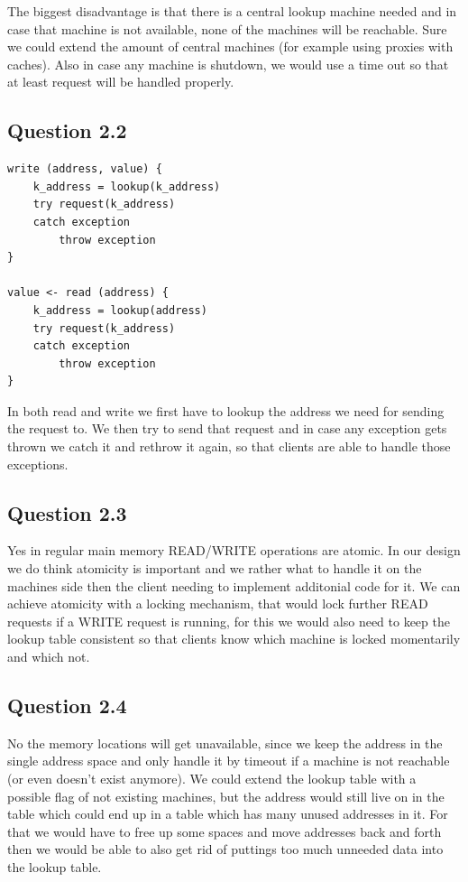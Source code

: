 \documentclass[12pt,a4paper]{article}
\begin{document}
The biggest disadvantage is that there is a central lookup machine needed and in case that machine is not available, none of the machines will be reachable.
Sure we could extend the amount of central machines (for example using proxies with caches).
Also in case any machine is shutdown, we would use a time out so that at least request will be handled properly.

\subsection{Question 2.2}

\begin{verbatim}
write (address, value) {
	k_address = lookup(k_address)
	try request(k_address)
	catch exception
		throw exception
}

value <- read (address) {
	k_address = lookup(address)
	try request(k_address)
	catch exception
		throw exception
}
\end{verbatim}

In both read and write we first have to lookup the address we need for sending the request to. We then try to send that request and in case any exception gets thrown we catch it and rethrow it again, so that clients are able to handle those exceptions.

\subsection{Question 2.3}
Yes in regular main memory READ/WRITE operations are atomic.
In our design we do think atomicity is important and we rather what to handle it on the machines side then the client needing to implement additonial code for it.
We can achieve atomicity with a locking mechanism, that would lock further READ requests if a WRITE request is running, for this we would also need to keep the lookup table consistent so that clients know which machine is locked momentarily and which not.

\subsection{Question 2.4}
No the memory locations will get unavailable, since we keep the address in the single address space and only handle it by timeout if a machine is not reachable (or even doesn't exist anymore).
We could extend the lookup table with a possible flag of not existing machines, but the address would still live on in the table which could end up in a table which has many unused addresses in it.
For that we would have to free up some spaces and move addresses back and forth then we would be able to also get rid of puttings too much unneeded data into the lookup table.
\end{document}

